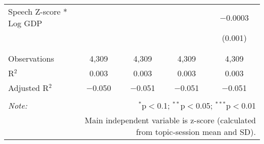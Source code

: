 \begin{table}[!htbp]
\begin{tabular}{@{\extracolsep{5pt}}lcccc}
 Speech Z-score * Log GDP &  &  &  & $-$0.0003 \\ 
  &  &  &  & (0.001) \\ 
  & & & & \\ 
\hline \\[-1.8ex] 
Observations & 4,309 & 4,309 & 4,309 & 4,309 \\ 
R$^{2}$ & 0.003 & 0.003 & 0.003 & 0.003 \\ 
Adjusted R$^{2}$ & $-$0.050 & $-$0.051 & $-$0.051 & $-$0.051 \\ 
\hline 
\hline \\[-1.8ex] 
\textit{Note:}  & \multicolumn{4}{r}{$^{*}$p$<$0.1; $^{**}$p$<$0.05; $^{***}$p$<$0.01} \\ 
 & \multicolumn{4}{r}{Main independent variable is z-score (calculated from topic-session mean and SD).} \\ 
\end{tabular} 
\end{table} 

